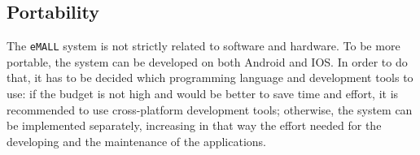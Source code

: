 \subsection{Portability}
\label{subsec:portability}%
The \verb|eMALL| system is not strictly related to software and hardware.
To be more portable, the system can be developed on both Android and IOS\@.
In order to do that, it has to be decided which programming language and development tools to use:
if the budget is not high and would be better to save time and effort, it is recommended to use cross-platform
development tools;
otherwise, the system can be implemented separately,
increasing in that way the effort needed for the developing and the maintenance of the applications.